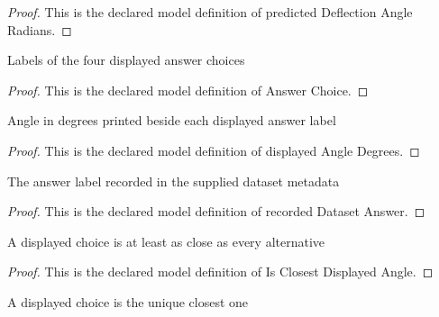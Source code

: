 \begin{proof}
  This is the declared model definition of predicted Deflection Angle Radians.
\end{proof}
\begin{definition}
  \label{def:physics:phyx-mini-0909:phyxminiproblems-problemphyxmini0909-answerchoice}
  Labels of the four displayed answer choices
\end{definition}
\begin{proof}
  This is the declared model definition of Answer Choice.
\end{proof}
\begin{definition}
  \label{def:physics:phyx-mini-0909:phyxminiproblems-problemphyxmini0909-answerchoice-displayedangledegrees}
  Angle in degrees printed beside each displayed answer label
\end{definition}
\begin{proof}
  This is the declared model definition of displayed Angle Degrees.
\end{proof}
\begin{definition}
  \label{def:physics:phyx-mini-0909:phyxminiproblems-problemphyxmini0909-recordeddatasetanswer}
  The answer label recorded in the supplied dataset metadata
\end{definition}
\begin{proof}
  This is the declared model definition of recorded Dataset Answer.
\end{proof}
\begin{definition}
  \label{def:physics:phyx-mini-0909:phyxminiproblems-problemphyxmini0909-isclosestdisplayedangle}
  A displayed choice is at least as close as every alternative
\end{definition}
\begin{proof}
  This is the declared model definition of Is Closest Displayed Angle.
\end{proof}
\begin{definition}
  \label{def:physics:phyx-mini-0909:phyxminiproblems-problemphyxmini0909-isuniqueclosestdisplayedangle}
  A displayed choice is the unique closest one
\end{definition}
